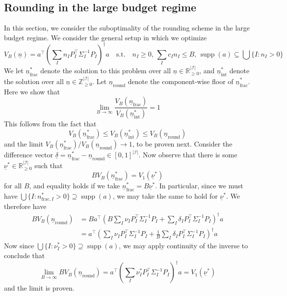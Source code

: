 \documentclass{article} %
\DeclareMathOperator{\supp}{supp}
\begin{document}
\subsection{Rounding in the large budget regime}\label{sec:rounding}
In this section, we consider the suboptimality of the rounding scheme in the large budget regime. We consider the general setup in which we optimize
\[
V_B(\underline{n}) = a^\top \left(\sum_{I} n_I P_I^\top \Sigma_I^{-1} P_I\right)^\dagger a\quad\text{s.t.}\quad n_I\geq0,\, \sum_I c_In_I\leq B,\, \supp(a)\subseteq\bigcup\{I:n_I>0\}
\]
We let $\underline{n}^*_\text{frac}$ denote the solution to this problem over all $\underline{n}\in\mathbb{R}^{|\mathcal{I}|}_{\geq0}$, and $\underline{n}^*_{\text{int}}$ denote the solution over all $\underline{n}\in\mathbb{Z}^{|\mathcal{I}|}_{\geq0}$. Let $\underline{n}_{\text{round}}$ denote the component-wise floor of $\underline{n}^*_{\text{frac}}$. Here we show that
\[
\lim_{B\to\infty} \frac{V_B(\underline{n}_{\text{frac}})}{V_B(\underline{n}^*_{\text{int}})}=1
\]
This follows from the fact that
\[
V_B(\underline{n}^*_{\text{frac}}) \leq V_B(\underline{n}^*_{\text{int}}) \leq V_B(\underline{n}_{\text{round}})
\]
and the limit $V_B(\underline{n}^*_{\text{frac}}) / V_B(\underline{n}_{\text{round}}) \to1$, to be proven next. Consider the difference vector $\underline{\delta} = \underline{n}^*_{\text{frac}}-\underline{n}_{\text{round}}\in[0,1]^{|\mathcal{I}|}$. Now observe that there is some $\underline{\nu}^*\in\mathbb{R}_{\geq0}^{|\mathcal{I}|}$ such that
\[
BV_B(\underline{n}_{\text{frac}}^*)= V_1(\underline{\nu}^*)
\]
for all $B$, and equality holds if we take $\underline{n}_{\text{frac}}^*=B\underline{\nu}^*$. In particular, since we must have $\bigcup\{I:n^*_{\text{frac},I}>0\}\supseteq \supp(a)$, we may take the same to hold for $\underline{\nu}^*$. We therefore have
\begin{align*}
    BV_B(\underline{n}_{\text{round}})&=Ba^\top\left(B\sum_I \nu_I P_I^\top\Sigma_I^{-1}P_I + \sum_I \delta_I P_I^\top \Sigma_I^{-1}P_I\right)^\dagger a \\
    &= a^\top \left(\sum_I \nu_I P_I^\top\Sigma_I^{-1}P_I + \frac{1}{B}\sum_I \delta_I P_I^\top \Sigma_I^{-1}P_I\right)^\dagger a 
\end{align*}
Now since $\bigcup\{I:{\nu}^*_I>0\}\supseteq\supp(a)$, we may apply continuity of the inverse to conclude that
\[
\lim_{B\to\infty} BV_B(\underline{n}_{\text{round}}) = a^\top \left(\sum_I \nu_I^* P_I^\top\Sigma_I^{-1}P_I \right)^\dagger a =V_1(\underline{\nu}^*)
\]
and the limit is proven.
\end{document}
